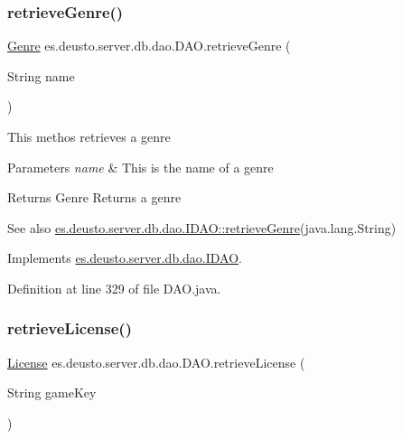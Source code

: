 \subsubsection{\texorpdfstring{retrieve\+Genre()}{retrieveGenre()}}
{\footnotesize\ttfamily \hyperlink{classes_1_1deusto_1_1server_1_1db_1_1data_1_1_genre}{Genre} es.\+deusto.\+server.\+db.\+dao.\+D\+A\+O.\+retrieve\+Genre (\begin{DoxyParamCaption}\item[{String}]{name }\end{DoxyParamCaption})}

This methos retrieves a genre 
\begin{DoxyParams}{Parameters}
{\em name} & This is the name of a genre \\
\hline
\end{DoxyParams}
\begin{DoxyReturn}{Returns}
Genre Returns a genre 
\end{DoxyReturn}
\begin{DoxySeeAlso}{See also}
\hyperlink{interfacees_1_1deusto_1_1server_1_1db_1_1dao_1_1_i_d_a_o_a8b15955637f9b81c57900761c6d03571}{es.\+deusto.\+server.\+db.\+dao.\+I\+D\+A\+O\+::retrieve\+Genre}(java.\+lang.\+String) 
\end{DoxySeeAlso}


Implements \hyperlink{interfacees_1_1deusto_1_1server_1_1db_1_1dao_1_1_i_d_a_o_a8b15955637f9b81c57900761c6d03571}{es.\+deusto.\+server.\+db.\+dao.\+I\+D\+AO}.



Definition at line 329 of file D\+A\+O.\+java.

\mbox{\label{classes_1_1deusto_1_1server_1_1db_1_1dao_1_1_d_a_o_a02fd634e6bd7a087b1476ab161af646f}} 
\subsubsection{\texorpdfstring{retrieve\+License()}{retrieveLicense()}}
{\footnotesize\ttfamily \hyperlink{classes_1_1deusto_1_1server_1_1db_1_1data_1_1_license}{License} es.\+deusto.\+server.\+db.\+dao.\+D\+A\+O.\+retrieve\+License (\begin{DoxyParamCaption}\item[{String}]{game\+Key }\end{DoxyParamCaption})}

